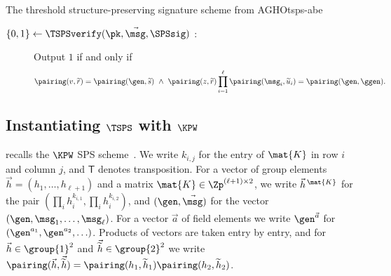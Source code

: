 \begin{protocolbox}{The threshold structure-preserving signature scheme from AGHO}{tsps-abe}
\begin{description}
    \item[$\{0,1\} \leftarrow \TSPSverify(\pk, \vec{\msg}, \SPSsig)$ :] Output
$1$ if and only if
      \begin{equation*}
	\pairing(v, \widetilde{r}) = \pairing(\gen, \widetilde{s}) \ \wedge\
\pairing(z, \widetilde{r}) \prod_{i=1}^{\ell} \pairing(\msg_i, \widetilde{u}_i)
= \pairing(\gen, \ggen).
      \end{equation*}

  \end{description}

\end{protocolbox}

\subsection{Instantiating $\TSPS$ with $\KPW$}\label{sec:tsps-kiltz}

 recalls the $\KPW$ SPS scheme~\cite{C:KilPanWee15}. We write
$k_{i,j}$ for the entry of $\mat{K}$ in row $i$ and column $j$, and
$\mathsf{T}$ denotes transposition. For a vector of group elements $\vec{h} =
(h_1, \ldots, h_{\ell+1})$ and a matrix $\mat{K} \in \Zp^{(\ell+1) \times 2}$,
we write $\vec{h}^{\,\mat{K}}$ for the pair $(\prod_i h_i^{k_{i,1}}, \prod_i
h_i^{k_{i,2}})$, and $(\gen, \vec{\msg})$ for the vector $(\gen, \msg_1, \ldots,
\msg_\ell)$. For a vector $\vec{a}$ of field
elements we write $\gen^{\vec{a}}$ for $(\gen^{a_1}, \gen^{a_2}, \ldots)$.
Products of vectors are taken entry by entry, and for $\vec{h} \in \group{1}^2$
and $\vec{\widetilde{h}} \in \group{2}^2$ we write $\pairing(\vec{h},
\vec{\widetilde{h}}) = \pairing(h_1, \widetilde{h}_1)\pairing(h_2,
\widetilde{h}_2)$.

